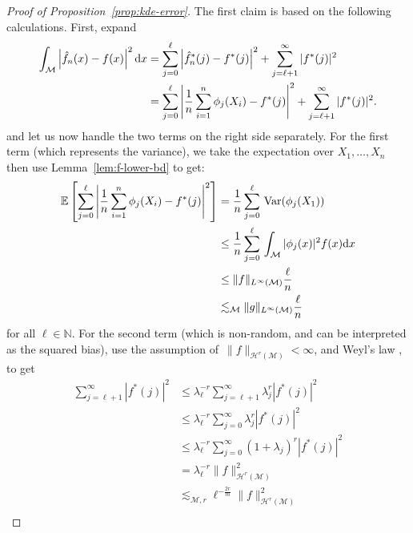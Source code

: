 \documentclass[preprint]{imsart}
\theoremstyle{plain}
\theoremstyle{definition}
\newcommand{\Nbb}{\mathbb{N}}
\newcommand{\Ebb}{\mathbb{E}}
\newcommand{\Var}{\textnormal{Var}}
\newcommand{\Mcal}{\mathcal{M}}
\newcommand{\Hcal}{\mathcal{H}}
\newcommand{\diff}{\textnormal{d}}
\begin{document}
\begin{appendix}
\begin{proof}[Proof of Proposition~\ref{prop:kde-error}]
    The first claim is based on the following calculations.
    First, expand
    \begin{equation}\label{eqn:kde-1-k1}
        \begin{split}
            \int_{\Mcal}\left|\hat{f}_n(x)-f(x)\right|^2\diff x &= \sum_{j=0}^{\ell}\left|\hat{f}_n^{\ast}(j)-f^{\ast}(j)\right|^2+\sum_{j=\ell+1}^{\infty}|f^{\ast}(j)|^2 \\
            &= \sum_{j=0}^{\ell}\left|\frac{1}{n}\sum_{i=1}^{n}\phi_j(X_i)-f^{\ast}(j)\right|^2+\sum_{j= \ell+1}^{\infty}|f^{\ast}(j)|^2.
        \end{split}
    \end{equation}
    and let us now handle the two terms on the right side separately.
    For the first term (which represents the variance), we take the expectation over $X_1,\ldots, X_n$ then use Lemma~\ref{lem:f-lower-bd} to get:
    \begin{equation}\label{eqn:kde-4-k1}
        \begin{split}
        \Ebb\left[\sum_{j=0}^{ \ell}\left|\frac{1}{n}\sum_{i=1}^{n}\phi_j(X_i)-f^{\ast}(j)\right|^2\right] &= \frac{1}{n}\sum_{j=0}^{\ell}\,\Var(\phi_j(X_1))\\
        &\le \frac{1}{n}\sum_{j=0}^{\ell}\,\int_{\Mcal}|\phi_j(x)|^2f(x)\diff x \\
        &\le \|f\|_{L^\infty(\Mcal)}\frac{\ell}{n} \\
        &\lesssim_{\Mcal}\|g\|_{L^\infty(\Mcal)}\frac{\ell}{n} \\
        \end{split}
    \end{equation}
    for all $\ell\in\Nbb$.
    For the second term (which is non-random, and can be interpreted as the squared bias), use the assumption of~$\|f\|_{\Hcal^r(\Mcal)}<\infty$, and Weyl's law \cite[Section~VI.4]{Chavel}, to get
    \begin{equation}\label{eqn:kde-2-k1}
        \begin{split}
            \sum_{j= \ell+1}^{\infty}|f^{\ast}(j)|^2 &\le \lambda_{\ell}^{-r}\sum_{j= \ell+1}^{\infty}\lambda_{j}^{r}|f^{\ast}(j)|^2 \\
            &\le \lambda_{\ell}^{-r}\sum_{j=0}^{\infty}\lambda_{j}^{r}|f^{\ast}(j)|^2 \\
            &\le \lambda_{\ell}^{-r}\sum_{j=0}^{\infty}(1+\lambda_{j})^{r}|f^{\ast}(j)|^2 \\
            &= \lambda_{\ell}^{-r}\|f\|_{\Hcal^r(\Mcal)}^2 \\     &\lesssim_{\Mcal,r} \ell^{-\frac{2r}{m}}\|f\|_{\Hcal^r(\Mcal)}^2 \\

\end{split}
\end{equation}
\end{proof}
\end{appendix}
\end{document}
